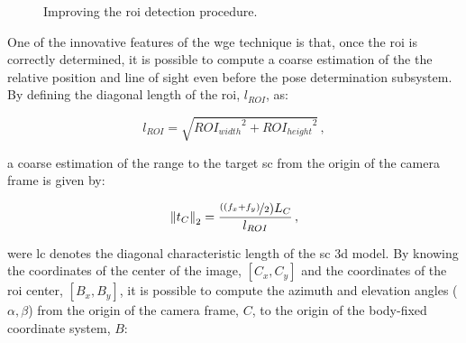 \begin{figure}[htbp]
  \centering
  \qquad
  \caption{Improving the \acrshort{roi} detection procedure.}
  \label{fig:roicomparisons}
\end{figure}

One of the innovative features of the \acrshort{wge} technique is that, once the \acrshort{roi} is correctly determined, it is possible to compute a coarse estimation of the the relative position and line of sight even before the pose determination subsystem. By defining the diagonal length of the \acrshort{roi}, $l_{ROI}$, as:

\begin{equation}
  l_{ROI} = \sqrt{{ROI_{width}}^2 + {ROI_{height}}^2} \,,
\end{equation}

a coarse estimation of the range to the target \acrshort{sc} from the origin of the camera frame is given by:

\begin{equation}
  \left\lVert t_C\right\rVert_2 = \frac{\nicefrac{((f_x+f_y)}{2}) L_C}{l_{ROI}} \,,
\end{equation}

were \gls{lc} denotes the diagonal characteristic length of the \acrshort{sc} \acrshort{3d} model. By knowing the coordinates of the center of the image, $[C_x, C_y]$ and the coordinates of the \acrshort{roi} center, $[B_x, B_y]$, it is possible to compute the azimuth and elevation angles ($\alpha, \beta$) from the origin of the camera frame, $C$, to the origin of the body-fixed coordinate system, $B$:

